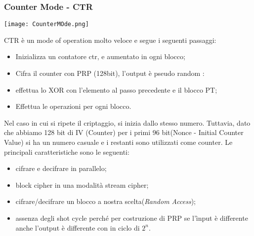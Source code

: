 \documentclass{article}
\theoremstyle{remark}
\begin{document}
\subsubsection{Counter Mode - CTR}
\begin{center}
    \texttt{[image: CounterMOde.png]}
\end{center}
CTR è un mode of operation molto veloce e segue i seguenti passaggi:
\begin{itemize}
    \item Inizializza un contatore ctr, e aumentato in ogni blocco;
    \item Cifra il counter con PRP (128bit), l'output è pseudo random :
    \item effettua lo XOR con l'elemento al passo precedente e il blocco PT;
    \item Effettua le operazioni per ogni blocco.
\end{itemize}
Nel caso in cui si ripete il criptaggio, si inizia dallo stesso numero. Tuttavia, dato che abbiamo 128 bit di IV (Counter) per i primi 96 bit(Nonce - Initial Counter Value) si ha un numero casuale e i restanti sono utilizzati come counter. 
Le principali caratteristiche sono le seguenti:\begin{itemize}
    \item cifrare e decifrare in parallelo;
    \item block cipher in una modalità stream cipher;
    \item cifrare/decifrare un blocco a nostra scelta(\emph{Random Access});
    \item assenza degli shot cycle perché per costruzione di PRP se l'ìnput è differente anche l'output è differente con in ciclo di $2^{n}$.
\end{itemize}
\end{document}
